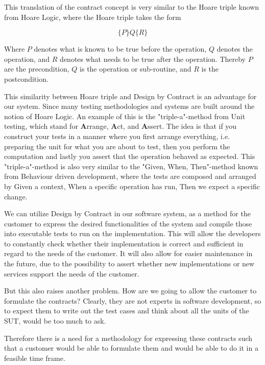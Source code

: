 This translation of the contract concept is very similar to the Hoare triple known from Hoare Logic, where the Hoare triple takes the form

\begin{equation}
\{P\} Q \{R\}
\end{equation}

Where $P$ denotes what is known to be true before the operation, $Q$ denotes the operation, and $R$ denotes what needs to be true after the operation. Thereby $P$ are the precondition, $Q$ is the operation or sub-routine, and $R$ is the postcondition. 

This similarity between Hoare triple and Design by Contract is an advantage for our system. Since many testing methodologies and systems are built around the notion of Hoare Logic. 
An example of this is the "triple-a"-method from Unit testing, which stand for \textbf{A}rrange, \textbf{A}ct, and \textbf{A}ssert.
The idea is that if you construct your tests in a manner where you first arrange everything, i.e. preparing the unit for what you are about to test, then you perform the computation and lastly you assert that the operation behaved as expected. 
This "triple-a"-method is also very similar to the "Given, When, Then"-method known from Behaviour driven development, where the tests are composed and arranged by Given a context, When a specific operation has run, Then we expect a specific change. 

We can utilize Design by Contract in our software system, as a method for the customer to express the desired functionalities of the system and compile those into executable tests to run on the implementation. 
This will allow the developers to constantly check whether their implementation is correct and sufficient in regard to the needs of the customer. 
It will also allow for easier maintenance in the future, due to the possibility to assert whether new implementations or new services support the needs of the customer.

But this also raises another problem. 
How are we going to allow the customer to formulate the contracts? 
Clearly, they are not experts in software development, so to expect them to write out the test cases and think about all the units of the SUT, would be too much to ask.

Therefore there is a need for a methodology for expressing these contracts such that a customer would be able to formulate them and would be able to do it in a feasible time frame.
